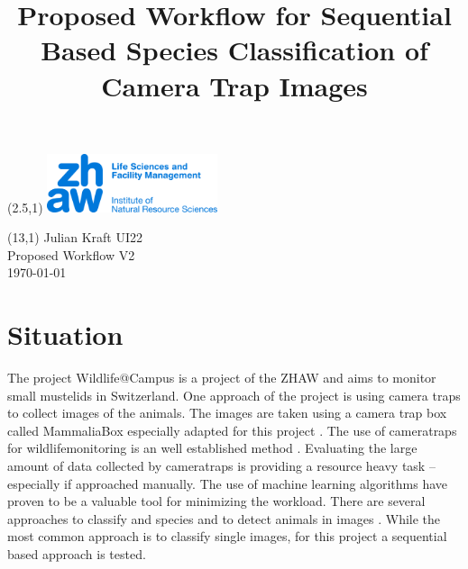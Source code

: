 \documentclass{article}
\title{Proposed Workflow for Sequential Based Species Classification of Camera Trap Images}
\makeatletter
\renewcommand{\maketitle}{
  \begin{flushleft} 
    \Large\textmd{\@title} 
    \par
  \end{flushleft}
}
\makeatother
\begin{document}
\begin{textblock}{5}(2.5,1) %
  \includegraphics[width=5cm]{resources/logo.jpg} %
\end{textblock}

\begin{textblock}{6}(13,1) %
        \raggedleft
        Julian Kraft UI22\\
        Proposed Workflow V2\\
        \today
\end{textblock}

\vspace*{1.5cm}


\maketitle


\section*{Situation} %

The project Wildlife@Campus is a project of the ZHAW and aims to monitor small mustelids in Switzerland.
One approach of the project is using camera traps to collect images of the animals. 
The images are taken using a camera trap box called MammaliaBox especially adapted for this
project \autocite{grafWildlifeCampusKleineSaeugetiere2022}.
The use of cameratraps for wildlifemonitoring is an well established method 
\autocite{cordierCameraTrapResearch2022, beaudrotStandardizedAssessmentBiodiversity2016}. 
Evaluating the large amount of data collected by cameratraps
is providing a resource heavy task -- especially if approached manually. The use of machine learning algorithms 
have proven to be a valuable tool for minimizing the workload. There are several approaches to classify and species and
to detect animals in images \autocite{tabakMachineLearningClassify2019, bohnerSemiautomaticWorkflowProcess2023}. 
While the most common approach is to classify single images, for this project a sequential based approach is tested.
\end{document}
